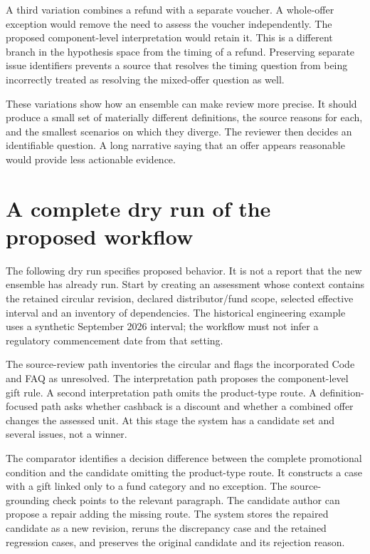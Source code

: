 \documentclass[12pt,a4paper,oneside,openany]{book}
\begin{document}
A third variation combines a refund with a separate voucher. A whole-offer
exception would remove the need to assess the voucher independently. The
proposed component-level interpretation would retain it. This is a different
branch in the hypothesis space from the timing of a refund. Preserving separate
issue identifiers prevents a source that resolves the timing question from
being incorrectly treated as resolving the mixed-offer question as well.

These variations show how an ensemble can make review more precise. It should
produce a small set of materially different definitions, the source reasons
for each, and the smallest scenarios on which they diverge. The reviewer then
decides an identifiable question. A long narrative saying that an offer appears
reasonable would provide less actionable evidence.

\section{A complete dry run of the proposed workflow}
\label{sec:circular-dryrun}
The following dry run specifies proposed behavior. It is not a report that the
new ensemble has already run. Start by creating an assessment whose context
contains the retained circular revision, declared distributor/fund scope,
selected effective interval and an inventory of dependencies. The historical
engineering example uses a synthetic September 2026 interval; the workflow must
not infer a regulatory commencement date from that setting.

The source-review path inventories the circular and flags the incorporated Code
and FAQ as unresolved. The interpretation path proposes the component-level
gift rule. A second interpretation path omits the product-type route. A
definition-focused path asks whether cashback is a discount and whether a
combined offer changes the assessed unit. At this stage the system has a
candidate set and several issues, not a winner.

The comparator identifies a decision difference between the complete promotional
condition and the candidate omitting the product-type route. It constructs a
case with a gift linked only to a fund category and no exception. The
source-grounding check points to the relevant paragraph. The candidate author
can propose a repair adding the missing route. The system stores the repaired
candidate as a new revision, reruns the discrepancy case and the retained
regression cases, and preserves the original candidate and its rejection reason.
\end{document}
